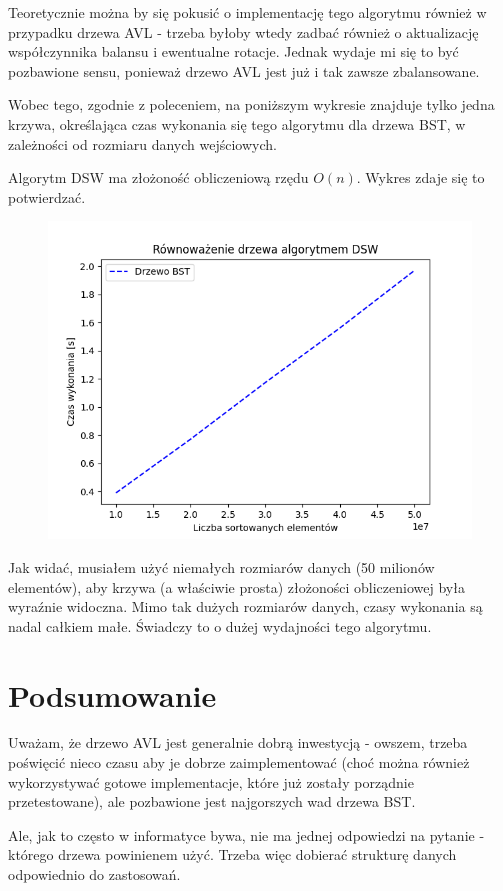 \documentclass[12pt]{article}
\begin{document}
        Teoretycznie można by się pokusić o implementację tego algorytmu również w przypadku drzewa AVL - trzeba byłoby wtedy zadbać również o aktualizację współczynnika balansu i ewentualne rotacje. Jednak wydaje mi się to być pozbawione sensu, ponieważ drzewo AVL jest już i tak zawsze zbalansowane.
        
        Wobec tego, zgodnie z poleceniem, na poniższym wykresie znajduje tylko jedna krzywa, określająca czas wykonania się tego algorytmu dla drzewa BST, w zależności od rozmiaru danych wejściowych.
        
        Algorytm DSW ma złożoność obliczeniową rzędu $O(n)$. Wykres zdaje się to potwierdzać.
        
        \begin{figure}[h]
            \centering
            \includegraphics[width=\textwidth]{wykresy/Równoważenie_drzewa_algorytmem_DSW.png}
        \end{figure}
        
        Jak widać, musiałem użyć niemałych rozmiarów danych (50 milionów elementów), aby krzywa (a właściwie prosta) złożoności obliczeniowej była wyraźnie widoczna. Mimo tak dużych rozmiarów danych, czasy wykonania są nadal całkiem małe. Świadczy to o dużej wydajności tego algorytmu.
        
    \section{Podsumowanie}
        Uważam, że drzewo AVL jest generalnie dobrą inwestycją - owszem, trzeba poświęcić nieco czasu aby je dobrze zaimplementować (choć można również wykorzystywać gotowe implementacje, które już zostały porządnie przetestowane), ale pozbawione jest najgorszych wad drzewa BST.
        
        Ale, jak to często w informatyce bywa, nie ma jednej odpowiedzi na pytanie - którego drzewa powinienem użyć. Trzeba więc dobierać strukturę danych odpowiednio do zastosowań.
    
\end{document}
